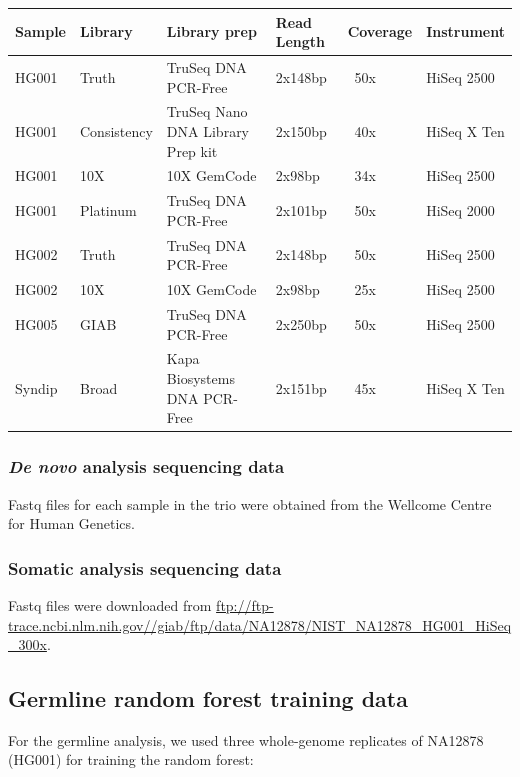 \documentclass{article}
\begin{document}
\begin{tabular}{llllll}
    \toprule
       Sample &   Library & Library prep & Read Length & Coverage & Instrument  \\
    \midrule
       HG001 &  Truth &       TruSeq DNA PCR-Free &           2x148bp &       ~50x &  HiSeq 2500 \\
       HG001 &  Consistency &       TruSeq Nano DNA Library Prep kit &           2x150bp &       ~40x &  HiSeq X Ten \\
       HG001 &  10X &     10X GemCode  &    2x98bp &       ~34x &  HiSeq 2500 \\
       HG001 &  Platinum &   TruSeq DNA PCR-Free    &    2x101bp &       ~50x &  HiSeq 2000 \\
       HG002 &  Truth &       TruSeq DNA PCR-Free &           2x148bp &       ~50x &  HiSeq 2500 \\
       HG002 &  10X  &     10X GemCode   &   2x98bp &       ~25x &  HiSeq 2500 \\
       HG005 &  GIAB  &     TruSeq DNA PCR-Free   &   2x250bp &       ~50x &  HiSeq 2500 \\
       Syndip &  Broad  &     Kapa Biosystems DNA PCR-Free   &   2x151bp &       ~45x &  HiSeq X Ten \\
    \bottomrule
    \end{tabular}

\subsubsection*{\textit{De novo} analysis sequencing data}

Fastq files for each sample in the trio were obtained from the Wellcome Centre for Human Genetics.

\subsubsection*{Somatic analysis sequencing data}

Fastq files were downloaded from \url{ftp://ftp-trace.ncbi.nlm.nih.gov//giab/ftp/data/NA12878/NIST_NA12878_HG001_HiSeq_300x}.

\subsection*{Germline random forest training data}

For the germline analysis, we used three whole-genome replicates of NA12878 (HG001) for training the random forest:
\end{document}
